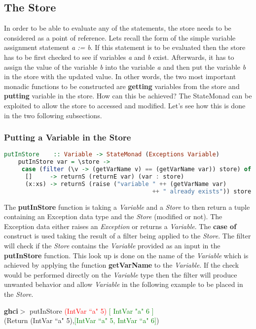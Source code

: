 \documentclass[a4paper, onecolumn]{article}
\begin{document}
    
    \subsection{The Store}
    In order to be able to evaluate any of the statements, the store needs to be considered as a point of reference. Lets recall the form of the simple variable assignment statement \textit{a := b}. If this statement is to be evaluated then the store has to be first checked to see if variables \textit{a} and \textit{b} exist. Afterwards, it has to assign the value of the variable \textit{b} into the variable \textit{a} and then put the variable \textit{b} in the store with the updated value. In other words, the two most important monadic functions to be constructed are \textbf{getting} variables from the store and \textbf{putting} variable in the store. How can this be achieved? The StateMonad can be exploited to allow the store to accessed and modified. Let's see how this is done in the two following subsections.
    
    \subsubsection{Putting a Variable in the Store}
    
    \begin{tcolorbox}
    \begin{lstlisting}[language=Haskell] 
    putInStore    :: Variable -> StateMonad (Exceptions Variable) 
    putInStore var = \store -> 
     case (filter (\v -> (getVarName v) == (getVarName var)) store) of
      []     -> returnS (returnE var) (var : store)                               
      (x:xs) -> returnS (raise ("variable " ++ (getVarName var)
                                          ++ " already exists")) store
    \end{lstlisting}
    \end{tcolorbox}
    
    \noindent The \textbf{putInStore} function is taking a \textit{Variable} and a \textit{Store} to then return a tuple containing an Exception data type and the \textit{Store} (modified or not). The Exception data either raises an \textit{Exception} or returns a \textit{Variable}. The \textbf{case of} construct is used taking the result of a filter being applied to the \textit{Store}. The filter will check if the \textit{Store} contains the \textit{Variable} provided as an input in the \textbf{putInStore} function. This look up is done on the name of the \textit{Variable} which is achieved by applying the function \textbf{getVarName} to the \textit{Variable}. If the check would be performed directly on the \textit{Variable} type then the filter will produce unwanted behavior and allow \textit{Variable} in the following example to be placed in the \textit{Store}. 
    \begin{center}
            \textbf{ghci$>$} putInStore \textcolor{red}{(IntVar ``a" 5)} \textcolor{green}{ $\big[$ IntVar "a" 6 $\big]$} \\
             (Return (IntVar ``a" 5),\textcolor{green}{$\big[$IntVar ``a" 5, IntVar ``a" 6$\big]$})
        \end{center}
    
\end{document}
